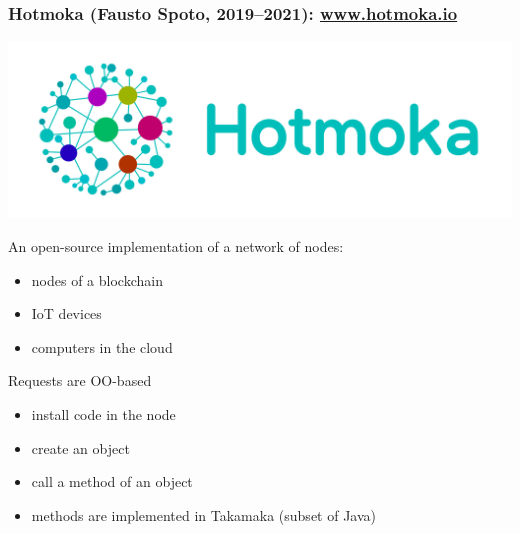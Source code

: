 \documentclass[11pt]{beamer}  %
\begin{document}
\begin{frame}
  \frametitle{Hotmoka (Fausto Spoto, 2019--2021): \url{www.hotmoka.io}}

  \begin{center}
    \includegraphics[scale=0.2,clip=false]{pictures/hotmoka_logo.png}
  \end{center}
  
  \begin{greenbox}{}
    An open-source implementation of a network of nodes:
    \begin{itemize}
    \item nodes of a blockchain
    \item IoT devices
    \item computers in the cloud
    \end{itemize}
  \end{greenbox}

  \bigskip

  \begin{greenbox}{Requests are OO-based}
    \begin{itemize}
    \item install code in the node
    \item create an object
    \item call a method of an object
    \item methods are implemented in Takamaka (subset of Java)
    \end{itemize}
  \end{greenbox}

\end{frame}
\end{document}
